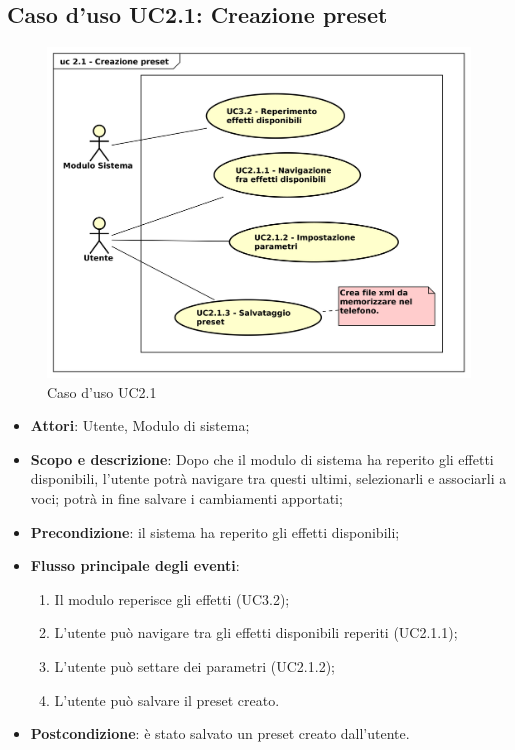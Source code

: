 \subsection{Caso d'uso UC2.1: Creazione preset}

\begin{figure}[htbp]
\centering
\includegraphics[scale=0.5]{UseCase_17_03_2016/immagini/uc_2_1_creazione_preset.png}
\captionsetup{labelfont=bf}
\caption{Caso d'uso UC2.1}
\end{figure}

\begin{itemize}
\item \textbf{Attori}: Utente, Modulo di sistema;
\item \textbf{Scopo e descrizione}: Dopo che il modulo di sistema ha reperito gli effetti disponibili, l'utente potrà navigare tra questi ultimi, selezionarli e associarli a voci; potrà in fine salvare i cambiamenti apportati;
\item \textbf{Precondizione}: il sistema ha reperito gli effetti disponibili;
\item \textbf{Flusso principale degli eventi}:
\begin{enumerate}
\item Il modulo reperisce gli effetti (UC3.2);
\item L'utente può navigare tra gli effetti disponibili reperiti (UC2.1.1);
\item L'utente può settare dei parametri (UC2.1.2);
\item L'utente può salvare il preset creato.
\end{enumerate}
\item \textbf{Postcondizione}: è stato salvato un preset creato dall'utente.
\end{itemize}

